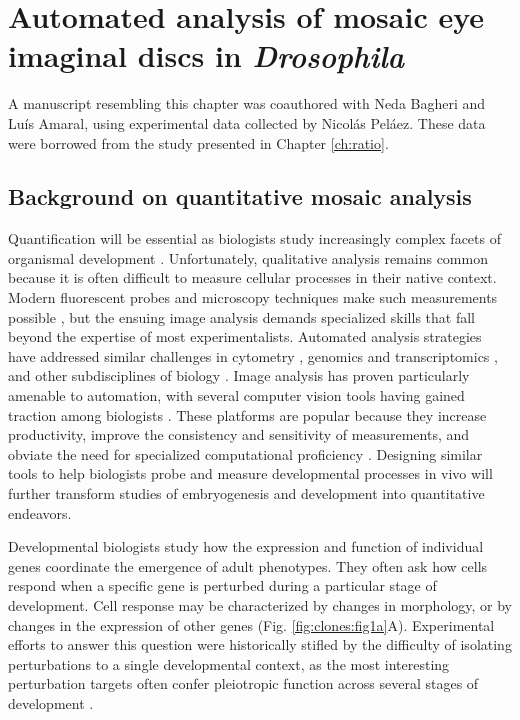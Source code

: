 
\graphicspath{ {./figures/clones/} }


\chapter{Automated analysis of mosaic eye imaginal discs in \textit{Drosophila}}
\label{ch:clones}

A manuscript resembling this chapter was coauthored with Neda Bagheri and Lu\'{i}s Amaral, using experimental data collected by Nicol\'{a}s Pel\'{a}ez. These data were borrowed from the study presented in Chapter \ref{ch:ratio}.


\section{Background on quantitative mosaic analysis}

Quantification will be essential as biologists study increasingly complex facets of organismal development \cite{Oates2009}. Unfortunately, qualitative analysis remains common because it is often difficult to measure cellular processes in their native context. Modern fluorescent probes and microscopy techniques make such measurements possible \cite{Muzzey2009a,Stelzer2014,Truong2011}, but the ensuing image analysis demands specialized skills that fall beyond the expertise of most experimentalists. Automated analysis strategies have addressed similar challenges in cytometry \cite{Aghaeepour2013,Chen2015,Pyne2009}, genomics and transcriptomics \cite{Bernstein2008,Hellemans2007,Langmead2012,Trapnell2009}, and other subdisciplines of biology \cite{Costes2004,Kelley2015}. Image analysis has proven particularly amenable to automation, with several computer vision tools having gained traction among biologists \cite{Carpenter2006,Paintdakhi2016,Schindelin2012,Sommer2011}. These platforms are popular because they increase productivity, improve the consistency and sensitivity of measurements, and obviate the need for specialized computational proficiency \cite{Jug2014,Sbalzarini2016,Schindelin2015}. Designing similar tools to help biologists probe and measure developmental processes in vivo will further transform studies of embryogenesis and development into quantitative endeavors.

Developmental biologists study how the expression and function of individual genes coordinate the emergence of adult phenotypes. They often ask how cells respond when a specific gene is perturbed during a particular stage of development. Cell response may be characterized by changes in morphology, or by changes in the expression of other genes (Fig. \ref{fig:clones:fig1a}A). Experimental efforts to answer this question were historically stifled by the difficulty of isolating perturbations to a single developmental context, as the most interesting perturbation targets often confer pleiotropic function across several stages of development \cite{IanSimpson2002,Parody1993,Shilo1991}. 

